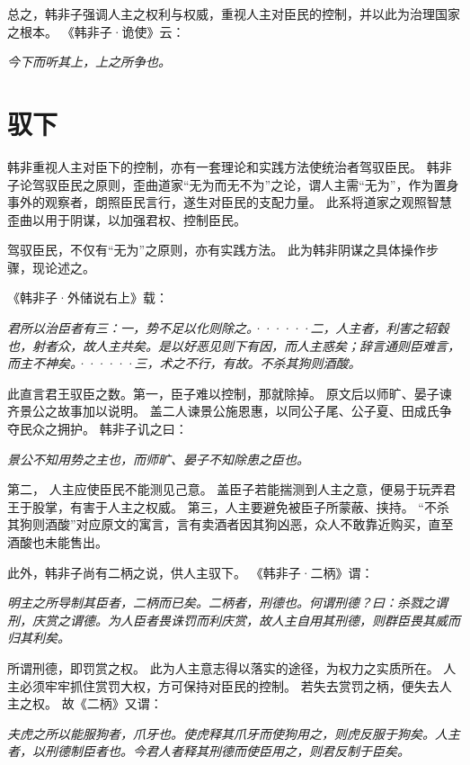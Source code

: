 \documentclass[11pt]{article}
\begin{document}
总之，韩非子强调人主之权利与权威，重视人主对臣民的控制，并以此为治理国家之根本。
《韩非子·诡使》云：

\textit{今下而听其上，上之所争也。}
  
\section{驭下}
韩非重视人主对臣下的控制，亦有一套理论和实践方法使统治者驾驭臣民。
韩非子论驾驭臣民之原则，歪曲道家“无为而无不为”之论，谓人主需“无为”，作为置身事外的观察者，朗照臣民言行，遂生对臣民的支配力量。
此系将道家之观照智慧歪曲以用于阴谋，以加强君权、控制臣民。

\par

驾驭臣民，不仅有“无为”之原则，亦有实践方法。
此为韩非阴谋之具体操作步骤，现论述之。

\par

《韩非子·外储说右上》载：

\textit{君所以治臣者有三：一，势不足以化则除之。······二，人主者，利害之轺毂也，射者众，故人主共矣。是以好恶见则下有因，而人主惑矣；辞言通则臣难言，而主不神矣。······三，术之不行，有故。不杀其狗则酒酸。}

此直言君王驭臣之数。第一，臣子难以控制，那就除掉。
原文后以师旷、晏子谏齐景公之故事加以说明。
盖二人谏景公施恩惠，以同公子尾、公子夏、田成氏争夺民众之拥护。
韩非子讥之曰：

\textit{景公不知用势之主也，而师旷、晏子不知除患之臣也。}
      
第二， 人主应使臣民不能测见己意。
盖臣子若能揣测到人主之意，便易于玩弄君王于股掌，有害于人主之权威。
第三，人主要避免被臣子所蒙蔽、挟持。
“不杀其狗则酒酸”对应原文的寓言，言有卖酒者因其狗凶恶，众人不敢靠近购买，直至酒酸也未能售出。

\par

此外，韩非子尚有二柄之说，供人主驭下。
《韩非子·二柄》谓：

\textit{明主之所导制其臣者，二柄而已矣。二柄者，刑德也。何谓刑德？曰：杀戮之谓刑，庆赏之谓德。为人臣者畏诛罚而利庆赏，故人主自用其刑德，则群臣畏其威而归其利矣。}

所谓刑德，即罚赏之权。
此为人主意志得以落实的途径，为权力之实质所在。
人主必须牢牢抓住赏罚大权，方可保持对臣民的控制。
若失去赏罚之柄，便失去人主之权。
故《二柄》又谓：

\textit{夫虎之所以能服狗者，爪牙也。使虎释其爪牙而使狗用之，则虎反服于狗矣。人主者，以刑德制臣者也。今君人者释其刑德而使臣用之，则君反制于臣矣。}
\end{document}
